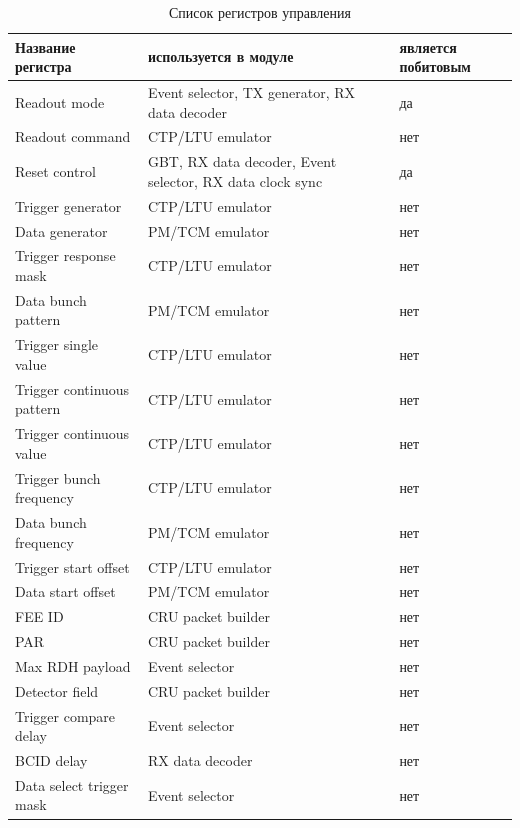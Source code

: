 \documentclass{article}
\begin{document}
\begin{table}[H]
\centering
\begin{tabular}{| l | l | l |}
\hline
Название регистра & используется в модуле & является побитовым \\ \hline
Readout mode & Event selector, TX generator, RX data decoder & да \\ \hline
Readout command & CTP/LTU emulator & нет \\ \hline
Reset control & GBT, RX data decoder, Event selector, RX data clock sync & да \\ \hline
Trigger generator & CTP/LTU emulator & нет \\ \hline
Data generator & PM/TCM emulator & нет \\ \hline
Trigger response mask & CTP/LTU emulator & нет \\ \hline
Data bunch pattern & PM/TCM emulator & нет \\ \hline
Trigger single value & CTP/LTU emulator & нет \\ \hline
Trigger continuous pattern & CTP/LTU emulator & нет \\ \hline
Trigger continuous value & CTP/LTU emulator & нет \\ \hline
Trigger bunch frequency & CTP/LTU emulator & нет \\ \hline
Data bunch frequency & PM/TCM emulator & нет \\ \hline
Trigger start offset & CTP/LTU emulator & нет \\ \hline
Data start offset & PM/TCM emulator & нет \\ \hline
FEE ID & CRU packet builder & нет \\ \hline
PAR & CRU packet builder & нет \\ \hline
Max RDH payload &  Event selector & нет \\ \hline
Detector field & CRU packet builder & нет \\ \hline
Trigger compare delay &  Event selector & нет \\ \hline
BCID delay & RX data decoder & нет \\ \hline
Data select trigger mask &  Event selector & нет \\ \hline
\end{tabular}
\caption{Список регистров управления\label{tab1}}
\end{table}
\end{document}
